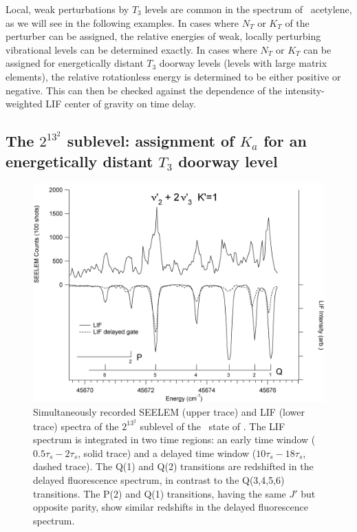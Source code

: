 \documentclass[12pt]{mitthesis}
\begin{document}
Local, weak perturbations by $T_3$ levels are common in the spectrum
of \astate\ acetylene, as we will see in the following examples.  In
cases where $N_T$ or $K_T$ of the perturber can be assigned, the
relative energies of weak, locally perturbing vibrational levels can
be determined exactly.  In cases where $N_T$ or $K_T$ can be assigned
for energetically distant $T_3$ doorway levels (levels with large
matrix elements), the relative rotationless energy is determined to be
either positive or negative.  This can then be checked against the
dependence of the intensity-weighted LIF center of gravity on time
delay.

\subsection{The $2^13^2$  sublevel: assignment of $K_a$ for an
  energetically distant $T_3$ doorway level}



\begin{figure}
  \caption{Simultaneously recorded SEELEM (upper trace) and LIF (lower
    trace) spectra of the $2^13^2$  sublevel of the \astate\
    state of .  The LIF spectrum is integrated in two time
    regions: an early time window ($0.5\tau_s-2\tau_s$, solid trace)
    and a delayed time window ($10\tau_s-18\tau_s$, dashed trace).
    The Q(1) and Q(2) transitions are redshifted in the delayed
    fluorescence spectrum, in contrast to the Q(3,4,5,6) transitions.
    The P(2) and Q(1) transitions, having the same $J'$ but opposite
    parity, show similar redshifts in the delayed fluorescence
    spectrum.}
  \label{fig:spectrum-2132}
  \centering
  \vspace{1cm}
  \includegraphics[width=7in,angle=90]{acetylene-2132-q6q1.png}
\end{figure}
\end{document}
